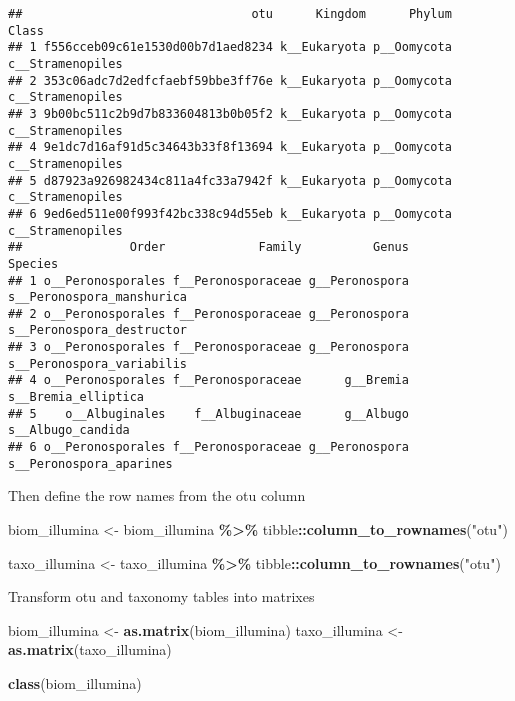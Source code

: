 \documentclass[
]{article}
\newenvironment{Shaded}{\begin{snugshade}}{\end{snugshade}}
\newcommand{\FunctionTok}[1]{\textcolor[rgb]{0.13,0.29,0.53}{\textbf{#1}}}
\newcommand{\NormalTok}[1]{#1}
\newcommand{\OtherTok}[1]{\textcolor[rgb]{0.56,0.35,0.01}{#1}}
\newcommand{\SpecialCharTok}[1]{\textcolor[rgb]{0.81,0.36,0.00}{\textbf{#1}}}
\newcommand{\StringTok}[1]{\textcolor[rgb]{0.31,0.60,0.02}{#1}}
\begin{document}
\begin{verbatim}
##                                otu      Kingdom      Phylum            Class
## 1 f556cceb09c61e1530d00b7d1aed8234 k__Eukaryota p__Oomycota c__Stramenopiles
## 2 353c06adc7d2edfcfaebf59bbe3ff76e k__Eukaryota p__Oomycota c__Stramenopiles
## 3 9b00bc511c2b9d7b833604813b0b05f2 k__Eukaryota p__Oomycota c__Stramenopiles
## 4 9e1dc7d16af91d5c34643b33f8f13694 k__Eukaryota p__Oomycota c__Stramenopiles
## 5 d87923a926982434c811a4fc33a7942f k__Eukaryota p__Oomycota c__Stramenopiles
## 6 9ed6ed511e00f993f42bc338c94d55eb k__Eukaryota p__Oomycota c__Stramenopiles
##               Order             Family          Genus                   Species
## 1 o__Peronosporales f__Peronosporaceae g__Peronospora s__Peronospora_manshurica
## 2 o__Peronosporales f__Peronosporaceae g__Peronospora s__Peronospora_destructor
## 3 o__Peronosporales f__Peronosporaceae g__Peronospora s__Peronospora_variabilis
## 4 o__Peronosporales f__Peronosporaceae      g__Bremia       s__Bremia_elliptica
## 5    o__Albuginales    f__Albuginaceae      g__Albugo         s__Albugo_candida
## 6 o__Peronosporales f__Peronosporaceae g__Peronospora   s__Peronospora_aparines
\end{verbatim}

Then define the row names from the otu column

\begin{Shaded}
\begin{Highlighting}[]
\NormalTok{biom\_illumina }\OtherTok{\textless{}{-}}\NormalTok{ biom\_illumina }\SpecialCharTok{\%\textgreater{}\%}
\NormalTok{  tibble}\SpecialCharTok{::}\FunctionTok{column\_to\_rownames}\NormalTok{(}\StringTok{"otu"}\NormalTok{) }

\NormalTok{taxo\_illumina }\OtherTok{\textless{}{-}}\NormalTok{ taxo\_illumina }\SpecialCharTok{\%\textgreater{}\%}
\NormalTok{  tibble}\SpecialCharTok{::}\FunctionTok{column\_to\_rownames}\NormalTok{(}\StringTok{"otu"}\NormalTok{) }
\end{Highlighting}
\end{Shaded}

Transform otu and taxonomy tables into matrixes

\begin{Shaded}
\begin{Highlighting}[]
\NormalTok{biom\_illumina }\OtherTok{\textless{}{-}} \FunctionTok{as.matrix}\NormalTok{(biom\_illumina)}
\NormalTok{taxo\_illumina }\OtherTok{\textless{}{-}} \FunctionTok{as.matrix}\NormalTok{(taxo\_illumina)}

\FunctionTok{class}\NormalTok{(biom\_illumina)}
\end{Highlighting}
\end{Shaded}
\end{document}

